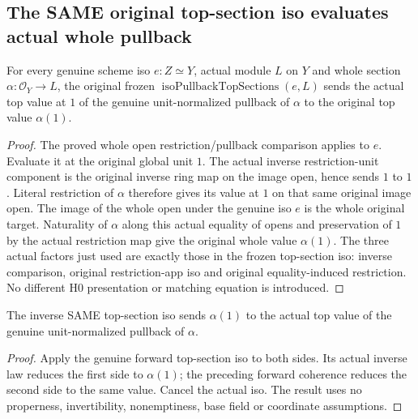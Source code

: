 \subsection{The SAME original top-section iso evaluates actual whole pullback}
\begin{theorem}
\label{thm:seven-iso-top-section-forward-coherence}
\leanok
For every genuine scheme iso $e:Z\simeq Y$, actual module $L$ on $Y$
and whole section $\alpha:\mathcal O_Y\to L$, the original frozen
$\operatorname{isoPullbackTopSections}(e,L)$ sends the actual top
value at $1$ of the genuine unit-normalized pullback of $\alpha$ to
the original top value $\alpha(1)$.
\end{theorem}
\begin{proof}
The proved whole open restriction/pullback comparison applies to $e$.
Evaluate it at the original global unit $1$. The actual inverse
restriction-unit component is the original inverse ring map on the
image open, hence sends $1$ to $1$. Literal restriction of $\alpha$
therefore gives its value at $1$ on that same original image open.
The image of the whole open under the genuine iso $e$ is the whole
original target. Naturality of $\alpha$ along this actual equality of
opens and preservation of $1$ by the actual restriction map give the
original whole value $\alpha(1)$. The three actual factors just used
are exactly those in the frozen top-section iso: inverse comparison,
original restriction-app iso and original equality-induced restriction.
No different H0 presentation or matching equation is introduced.
\end{proof}
\begin{theorem}
\label{thm:seven-iso-top-section-inverse-coherence}
\leanok
The inverse SAME top-section iso sends $\alpha(1)$ to the actual top
value of the genuine unit-normalized pullback of $\alpha$.
\end{theorem}
\begin{proof}
Apply the genuine forward top-section iso to both sides. Its actual
inverse law reduces the first side to $\alpha(1)$; the preceding
forward coherence reduces the second side to the same value. Cancel
the actual iso. The result uses no properness, invertibility,
nonemptiness, base field or coordinate assumptions.
\end{proof}


